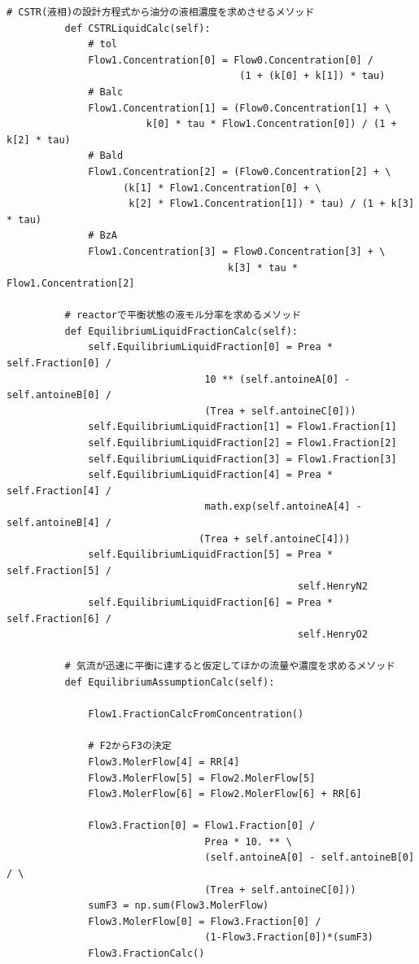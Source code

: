 \documentclass[a4j]{jsreport}
\begin{document}
\begin{lstlisting}[caption=気液反応器の解析(迅速に平衡)]
          # CSTR(液相)の設計方程式から油分の液相濃度を求めさせるメソッド
          def CSTRLiquidCalc(self):
              # tol
              Flow1.Concentration[0] = Flow0.Concentration[0] /
                                        (1 + (k[0] + k[1]) * tau)
              # Balc
              Flow1.Concentration[1] = (Flow0.Concentration[1] + \
                        k[0] * tau * Flow1.Concentration[0]) / (1 + k[2] * tau)
              # Bald
              Flow1.Concentration[2] = (Flow0.Concentration[2] + \
                    (k[1] * Flow1.Concentration[0] + \
                     k[2] * Flow1.Concentration[1]) * tau) / (1 + k[3] * tau)
              # BzA
              Flow1.Concentration[3] = Flow0.Concentration[3] + \
                                      k[3] * tau * Flow1.Concentration[2]

          # reactorで平衡状態の液モル分率を求めるメソッド
          def EquilibriumLiquidFractionCalc(self):
              self.EquilibriumLiquidFraction[0] = Prea * self.Fraction[0] /
                                  10 ** (self.antoineA[0] - self.antoineB[0] /
                                  (Trea + self.antoineC[0]))
              self.EquilibriumLiquidFraction[1] = Flow1.Fraction[1]
              self.EquilibriumLiquidFraction[2] = Flow1.Fraction[2]
              self.EquilibriumLiquidFraction[3] = Flow1.Fraction[3]
              self.EquilibriumLiquidFraction[4] = Prea * self.Fraction[4] /
                                  math.exp(self.antoineA[4] - self.antoineB[4] /
                                 (Trea + self.antoineC[4]))
              self.EquilibriumLiquidFraction[5] = Prea * self.Fraction[5] /
                                                  self.HenryN2
              self.EquilibriumLiquidFraction[6] = Prea * self.Fraction[6] /
                                                  self.HenryO2

          # 気流が迅速に平衡に達すると仮定してほかの流量や濃度を求めるメソッド
          def EquilibriumAssumptionCalc(self):

              Flow1.FractionCalcFromConcentration()

              # F2からF3の決定
              Flow3.MolerFlow[4] = RR[4]
              Flow3.MolerFlow[5] = Flow2.MolerFlow[5]
              Flow3.MolerFlow[6] = Flow2.MolerFlow[6] + RR[6]

              Flow3.Fraction[0] = Flow1.Fraction[0] /
                                  Prea * 10. ** \
                                  (self.antoineA[0] - self.antoineB[0] / \
                                  (Trea + self.antoineC[0]))
              sumF3 = np.sum(Flow3.MolerFlow)
              Flow3.MolerFlow[0] = Flow3.Fraction[0] /
                                  (1-Flow3.Fraction[0])*(sumF3)
              Flow3.FractionCalc()


\end{lstlisting}
\end{document}
